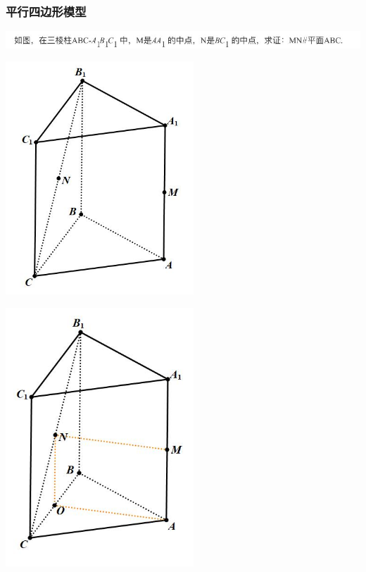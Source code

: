 \documentclass[hyperref, UTF8,11pt,a4paper]{ctexart} %
\begin{document}
\subsubsection{平行四边形模型}
\begin{center}


	\includegraphics[width=500pt]  {pic/litijihe/pxsbxmxtimu1.jpg} \\
	\begin{minipage}{200pt}
		\includegraphics[width=200pt]  {pic/litijihe/pxsbxmxtimu.jpg} \\

	\end{minipage}
	\hspace{3pt}
	\begin{minipage}{200pt}
		\includegraphics[width=200pt]  {pic/litijihe/pxsbxmxdaan.jpg} \\

	\end{minipage}
\end{center}
\end{document}
